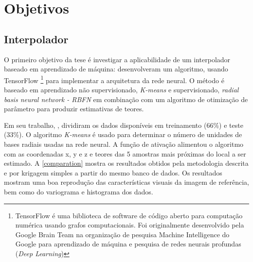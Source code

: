 \section{Objetivos}

\subsection{Interpolador}

O primeiro objetivo da tese é investigar a aplicabilidade de um interpolador baseado em aprendizado de máquina:  desenvolveram um algoritmo, usando TensorFlow \footnote{TensorFlow é uma biblioteca de software de código aberto para computação numérica usando grafos computacionais. Foi originalmente desenvolvido pela Google Brain Team na organização de pesquisa Machine Intelligence do Google para aprendizado de máquina e pesquisa de redes neurais profundas (\textit{Deep Learning})} para implementar a arquitetura da rede neural. O método é baseado em aprendizado não supervisionado, \textit{K-means} e supervisionado, \textit{radial basis neural network - RBFN} em combinação com um algoritmo de otimização de parâmetro para produzir estimativas de teores. 

Em seu trabalho, , dividiram os dados disponíveis em treinamento (66\%) e teste (33\%). O algoritmo \textit{K-means} é usado para determinar o número de unidades de bases radiais usadas na rede neural. A função de ativação  alimentou o algoritmo com as coordenadas x, y e z e teores das 5 amostras mais próximas do local a ser estimado. A \autoref{comparation} mostra os resultados obtidos pela metodologia descrita e por krigagem simples a partir do mesmo banco de dados. Os resultados mostram uma boa reprodução das características visuais da imagem de referência, bem como do variograma e histograma dos dados.


